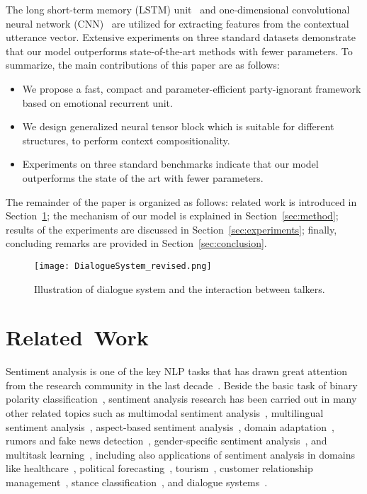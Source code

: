 \documentclass[journal]{IEEEtran}
\begin{document}
The long short-term memory (LSTM) unit~\cite{hochreiter1997long} and one-dimensional convolutional neural network (CNN)~\cite{kim2014convolutional} are utilized for extracting features from the contextual utterance vector. Extensive experiments on three standard datasets demonstrate that our model outperforms state-of-the-art methods with fewer parameters. To summarize, the main contributions of this paper are as follows:

\begin{itemize}
    \item We propose a fast, compact and parameter-efficient party-ignorant framework based on emotional recurrent unit.
    \item We design generalized neural tensor block which is suitable for different structures, to perform context compositionality.
    \item Experiments on three standard benchmarks indicate that our model outperforms the state of the art with fewer parameters.
\end{itemize}

The remainder of the paper is organized as follows: related work is introduced in Section~\ref{sec:related}; the mechanism of our model is explained in Section~\ref{sec:method}; results of the experiments are discussed in Section~\ref{sec:experiments}; finally, concluding remarks are provided in Section~\ref{sec:conclusion}.

\begin{figure}[t]
\centering\texttt{[image: DialogueSystem\_revised.png]}
\caption{Illustration of dialogue system and the interaction between talkers.}
\label{fig:DialogueSystem}
\end{figure}

\section{Related~Work}
\label{sec:related}
Sentiment analysis is one of the key NLP tasks that has drawn great attention from the research community in the last decade~\cite{cambig}. Beside the basic task of binary polarity classification~\cite{camnt6}, sentiment analysis research has been carried out in many other related topics such as multimodal sentiment analysis~\cite{zadmul,ragima}, multilingual sentiment analysis~\cite{esucro}, aspect-based sentiment analysis~\cite{weiasp}, domain adaptation~\cite{banlex,xuuins}, rumors and fake news detection~\cite{akhnoo,reisup}, gender-specific sentiment analysis~\cite{mihwha,buktyp}, and multitask learning~\cite{yanseg}, including also applications of sentiment analysis in domains like healthcare~\cite{mahdet,qurmul}, political forecasting~\cite{ebrcha}, tourism~\cite{valsen}, customer relationship management~\cite{biicro}, stance classification~\cite{duucom}, and dialogue systems~\cite{wellea,schint}.
\end{document}
